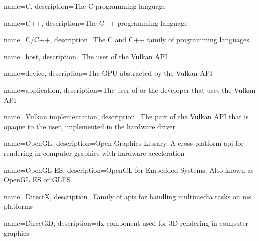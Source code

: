 

%
%







%
%

{
  name={C},
  description={The C programming language}
}

{
  name={C++},
  description={The C++ programming language}
}

{
  name={C/C++},
  description={The C and C++ family of programming languages}
}

{
  name={host},
  description={The user of the Vulkan API}
}

{
  name={device},
  description={The GPU abstracted by the Vulkan API}
}

{
  name={application},
  description={The user of or the developer that uses the Vulkan API}
}

{
  name={Vulkan implementation},
  description={The part of the Vulkan API that is opaque to the user, implemented in the hardware driver}
}

{
  name={OpenGL},
  description={Open Graphics Library. A cross-platform \gls{api} for rendering in computer graphics with hardware acceleration}
}

{
  name={OpenGL ES},
  description={OpenGL for Embedded Systems. Also known as OpenGL ES or GLES}
}

{
  name={DirectX},
  description={Family of \glspl{api} for handling multimedia tasks on \acrfull{ms} platforms}
}

{
  name={Direct3D},
  description={\gls{dx} component used for 3D rendering in computer graphics}
}
